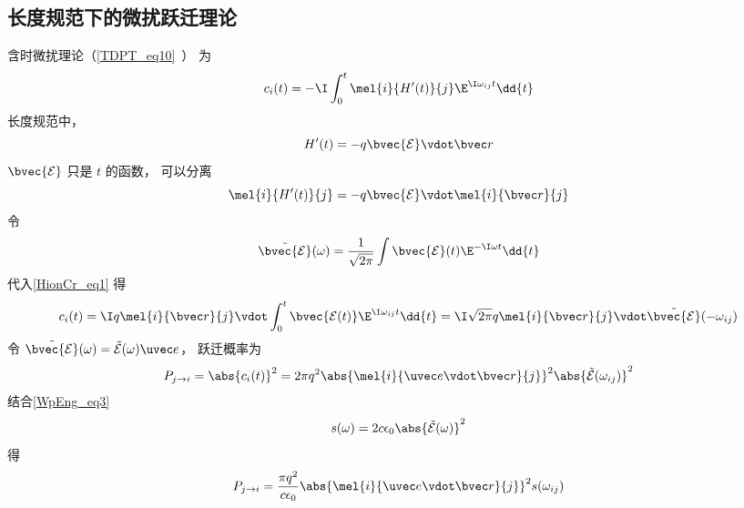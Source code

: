 \subsection{长度规范下的微扰跃迁理论}
含时微扰理论（\autoref{TDPT_eq10}~） 为
\begin{equation}\label{HionCr_eq1}
c_i(t) = -\I \int_0^t \mel{i}{H'(t)}{j} \E^{\I\omega_{ij} t} \dd{t}
\end{equation}
长度规范中，
\begin{equation}
H'(t) = -q\bvec {\mathcal E} \vdot \bvec r
\end{equation}
$\bvec {\mathcal E}$ 只是 $t$ 的函数， 可以分离
\begin{equation}
\mel{i}{H'(t)}{j} = -q\bvec {\mathcal E} \vdot \mel{i}{\bvec r}{j}
\end{equation}
令
\begin{equation}
\tilde {\bvec {\mathcal E}}(\omega) = \frac{1}{\sqrt{2\pi}} \int \bvec {\mathcal E}(t) \E^{-\I\omega t} \dd{t}
\end{equation}
代入\autoref{HionCr_eq1} 得
\begin{equation}
c_i(t) = \I q \mel{i}{\bvec r}{j} \vdot \int_0^t \bvec {\mathcal E(t)} \E^{\I\omega_{ij} t} \dd{t} = \I \sqrt{2\pi} q \mel{i}{\bvec r}{j} \vdot \tilde {\bvec {\mathcal E}}(-\omega_{ij})
\end{equation}
令 $\tilde {\bvec {\mathcal E}}(\omega) = \tilde {{\mathcal E}}(\omega)\uvec e$， 跃迁概率为
\begin{equation}\label{HionCr_eq2}
P_{j\to i} = \abs{c_i(t)}^2 = 2\pi q^2 \abs{\mel{i}{\uvec e \vdot \bvec r}{j}}^2 \abs{\tilde {{\mathcal E}}(\omega_{ij})}^2
\end{equation}
结合\autoref{WpEng_eq3}~
\begin{equation}
s(\omega) = 2c\epsilon_0 \abs{\tilde {{\mathcal E}}(\omega)}^2
\end{equation}
得
\begin{equation}
P_{j\to i} = \frac{\pi q^2}{c\epsilon_0} \abs{\mel{i}{\uvec e \vdot\bvec r}{j}}^2 s(\omega_{ij})
\end{equation}

